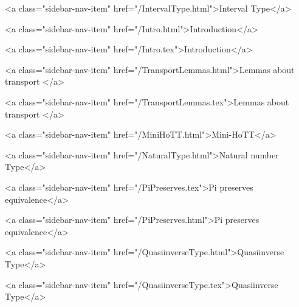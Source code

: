       
    
      
        
          <a class="sidebar-nav-item" href="/IntervalType.html">Interval Type</a>
        
      
    
      
        
          <a class="sidebar-nav-item" href="/Intro.html">Introduction</a>
        
      
    
      
        
          <a class="sidebar-nav-item" href="/Intro.tex">Introduction</a>
        
      
    
      
        
          <a class="sidebar-nav-item" href="/TransportLemmas.html">Lemmas about transport </a>
        
      
    
      
        
          <a class="sidebar-nav-item" href="/TransportLemmas.tex">Lemmas about transport </a>
        
      
    
      
        
          <a class="sidebar-nav-item" href="/MiniHoTT.html">Mini-HoTT</a>
        
      
    
      
        
          <a class="sidebar-nav-item" href="/NaturalType.html">Natural number Type</a>
        
      
    
      
        
          <a class="sidebar-nav-item" href="/PiPreserves.tex">Pi preserves equivalence</a>
        
      
    
      
        
          <a class="sidebar-nav-item" href="/PiPreserves.html">Pi preserves equivalence</a>
        
      
    
      
        
          <a class="sidebar-nav-item" href="/QuasiinverseType.html">Quasiinverse Type</a>
        
      
    
      
        
          <a class="sidebar-nav-item" href="/QuasiinverseType.tex">Quasiinverse Type</a>
        
